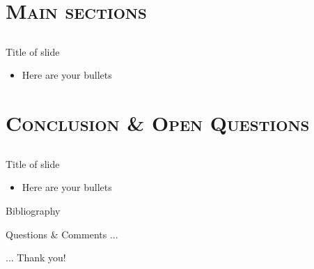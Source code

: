 \documentclass[xcolor=x11names,compress]{beamer}
\renewcommand{\(}{\begin{columns}}
\renewcommand{\)}{\end{columns}}
\newcommand{\<}[1]{\begin{column}{#1}}
\renewcommand{\>}{\end{column}}
\newcommand{\0}{\V{0}}
\newcommand{\1}{\V{1}}
\begin{document}
   
\section[Main sections]{\scshape Main sections}
\subsection[ ]{\scshape  }



\begin{frame}{Title of slide}

\begin{itemize}
\item Here are your bullets
\end{itemize} 


\end{frame} 

\section[Conclusion]{\scshape Conclusion \& Open Questions}
\subsection[ ]{\scshape  }



\begin{frame}{Title of slide}

\begin{itemize}
\item Here are your bullets
\end{itemize} 


\end{frame}

  


\begin{frame}{Bibliography}
\tiny
\nocite{delage15:rosplfaip,BenTal_Nemirov_1999,ben2004adjustable,ardestani2017LRC,ardestani2018:VFRLTP}
\nocite{BomzeKlerk:Copos,Burer:Copos,HanasusantoCoposWass,ParriloThesis,XuTSROCopos,zeng2013solving}





\end{frame}

\begin{frame}{}

{\LARGE \color{blue}
%
\vspace{0cm}Questions \& Comments ...\\




\vspace{5cm}
 \begin{flushright}... Thank you!\\\end{flushright}}
\end{frame}
\end{document}

